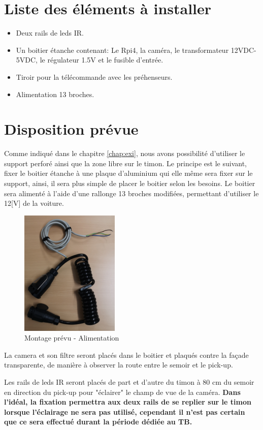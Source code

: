 \section{Liste des éléments à installer}
\begin{itemize}
    \item Deux rails de leds IR.
    \item Un boitier étanche contenant: Le Rpi4, la caméra, le transformateur 12VDC-5VDC, le régulateur 1.5V et le fusible d'entrée.
    \item Tiroir pour la télécommande avec les préhenseurs.
    \item Alimentation 13 broches.
\end{itemize}
\section{Disposition prévue}
Comme indiqué dans le chapitre \ref{chap:exi}, nous avons possibilité d'utiliser le support perforé ainsi que la zone libre sur le timon.
Le principe est le suivant, fixer le boitier étanche à une plaque d'aluminium qui elle même sera fixer sur le support, ainsi, il sera plus simple
de placer le boitier selon les besoins. Le boitier sera alimenté à l'aide d'une rallonge 13 broches modifiées, permettant d'utiliser le 12[V] de la voiture.
\begin{figure}[H]
    \centering
    \includegraphics[height=6cm, angle=90]{assets/figures/alim.jpg}
    \caption{Montage prévu - Alimentation}
\end{figure}
La camera et son filtre seront placés dans le boitier et plaqués contre la façade transparente, de manière à observer la route entre le semoir
et le pick-up.

Les rails de leds IR seront placés de part et d'autre du timon à 80 \si{\centi\metre} du semoir en direction du pick-up pour "éclairer" le champ
de vue de la caméra. \textbf{Dans l'idéal, la fixation permettra aux deux rails de se replier sur le timon lorsque l'éclairage ne sera pas utilisé,
    cependant il n'est pas certain que ce sera effectué durant la période dédiée au TB.}

